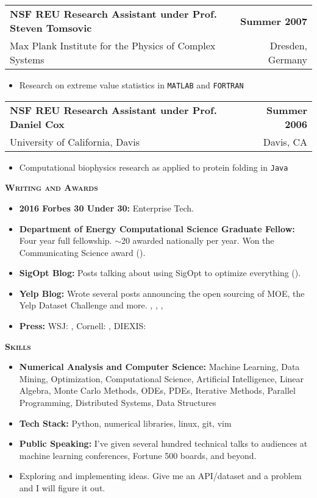 \documentclass[letterpaper, 11pt]{article}
\makeatletter
\renewcommand{\section}[1]{%
  \begin{tcolorbox}
    \textsc{\textbf{\large{#1}}}
  \end{tcolorbox}
}
\newcommand{\entry}[4]{%
  \begin{tabularx}{\linewidth}{@{}Xr@{}}
    \textbf{#2} & \textbf{#1} \\
    #3          & #4          \\
  \end{tabularx}
}
\makeatother
\begin{document}
  \entry{Summer 2007}{NSF REU Research Assistant under Prof. Steven Tomsovic}{Max Plank Institute for the Physics of Complex Systems}{Dresden, Germany}
  \begin{itemize}
    \item{Research on extreme value statistics in \texttt{MATLAB} and \texttt{FORTRAN}}
  \end{itemize}

  \entry{Summer 2006}{NSF REU Research Assistant under Prof. Daniel Cox}{University of California, Davis}{Davis, CA}
  \begin{itemize}
    \item{Computational biophysics research as applied to protein folding in \texttt{Java}}
  \end{itemize}

  \section{Writing and Awards}

  \begin{itemize}
    \item \textbf{2016 Forbes 30 Under 30:} Enterprise Tech. 
    \item \textbf{Department of Energy Computational Science Graduate Fellow:} Four year full fellowship. $\sim$20 awarded nationally per year. Won the Communicating Science award ().
    \item \textbf{SigOpt Blog:} Posts talking about using SigOpt to optimize everything ().
    \item \textbf{Yelp Blog:} Wrote several posts announcing the open sourcing of MOE, the Yelp Dataset Challenge and more. , , , 
    \item \textbf{Press:} WSJ: , Cornell: ,  DIEXIS: 
  \end{itemize}

  \section{Skills}

  \begin{itemize}
    \item \textbf{Numerical Analysis and Computer Science:} Machine Learning, Data Mining, Optimization, Computational Science, Artificial Intelligence, Linear Algebra, Monte Carlo Methods, ODEs, PDEs, Iterative Methods, Parallel Programming, Distributed Systems, Data Structures
    \item \textbf{Tech Stack:} Python, numerical libraries, linux, git, vim
    \item \textbf{Public Speaking:} I've given several hundred technical talks to audiences at machine learning conferences, Fortune 500 boards, and beyond.
    \item Exploring and implementing ideas. Give me an API/dataset and a problem and I will figure it out.
  \end{itemize}
\end{document}
